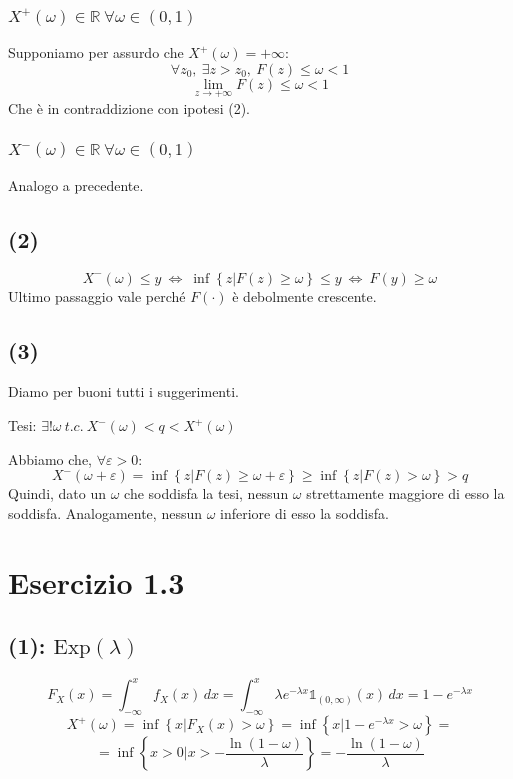 \documentclass{article}
\begin{document}
\subsubsection{$X^+(\omega) \in \mathbb{R} \ \forall \omega\in \left(0,1\right)$}
Supponiamo per assurdo che $X^+ (\omega) = +\infty$:
\[
	\forall z_0, \ \exists z>z_0, \ F(z) \leq \omega < 1
\]
\[
	\lim_{z\rightarrow +\infty} F(z) \leq \omega < 1	
\]
Che è in contraddizione con ipotesi (2).
\subsubsection{$X^-(\omega) \in \mathbb{R} \ \forall \omega\in \left(0,1\right)$}
Analogo a precedente.


\subsection{(2)}
\[
	X^-(\omega) \leq y \  \Longleftrightarrow  \  \inf \left\{z| F(z) \geq \omega\right\} \leq y \  \Longleftrightarrow  \  F(y) \geq \omega
\]
Ultimo passaggio vale perché $F(\cdot)$ è debolmente crescente.

\subsection{(3)}
Diamo per buoni tutti i suggerimenti.

Tesi: $\exists! \omega \ t.c. \ X^-(\omega) < q < X^+(\omega)$

Abbiamo che, $\forall \varepsilon > 0$:
\[
	X^-(\omega+\varepsilon) = \inf \left\{z| F(z) \geq \omega+\varepsilon\right\} \geq \inf \left\{z| F(z) > \omega\right\} > q
\]
Quindi, dato un $\omega$ che soddisfa la tesi, nessun $\omega$ strettamente maggiore di esso la soddisfa. Analogamente, nessun $\omega$ inferiore di esso la soddisfa.

\section{Esercizio 1.3}
\subsection{(1): $\mathrm{Exp}(\lambda)$}
\[
	F_X(x)= \int_{-\infty }^{x}f_X(x)\,dx = \int_{-\infty }^{x} \lambda e^{-\lambda x} \mathds{1}_{(0,\infty )}(x) \,dx = 1-e^{-\lambda x}
\]
\[
	X^+(\omega) = \inf\left\{x| F_X(x)>\omega\right\} = \inf\left\{x| 1-e^{-\lambda x} > \omega\right\} = 
\]
\[	= \inf\left\{x>0| x>- \frac{\ln\left(1 - \omega\right)}{\lambda} \right\} = - \frac{\ln\left(1 - \omega\right)}{\lambda}\]
\end{document}
